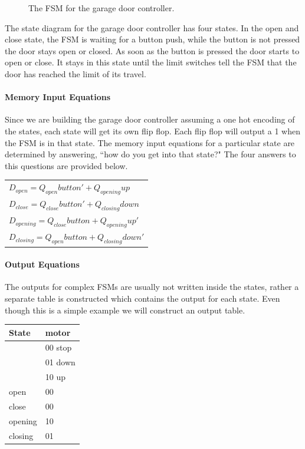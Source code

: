 \begin{enumerate}
\begin{onlysolution}
{\begin{figure}[ht]
\caption{The FSM for the garage door controller.}
\end{figure}

The state diagram for the garage door controller has four states.
In the open and close state, the FSM is waiting for a button push,
while the button is not pressed the door stays open or closed.  As
soon as the button is pressed the door starts to open or close.
It stays in this state until the limit switches tell the FSM that
the door has reached the limit of its travel.

\paragraph{Memory Input Equations}
Since we are building the garage door controller assuming a
one hot encoding of the states, each state will get its own
flip flop.  Each flip flop will output a 1 when the FSM is 
in that state.  The memory input equations for a particular
state are determined by answering, ``how do you get into that 
state?" The four answers to this questions are provided below.

\begin{tabular}{l}
$D_{open} = Q_{open}button' + Q_{opening}up$ \\
$D_{close} = Q_{close}button' + Q_{closing}down$ \\
$D_{opening} = Q_{close}button+ Q_{opening}up'$ \\
$D_{closing}  = Q_{open}button+ Q_{closing}down'$ \\
\end{tabular}


\paragraph{Output Equations}
The outputs for complex FSMs are usually not written inside the
states, rather a separate table is constructed which contains the
output for each state.   Even though this is a simple example
we will construct an output table.

\begin{tabular}{l|l}
State	& motor		\\ \hline
	& 00 stop	\\ \hline
	& 01 down	\\ \hline
	& 10 up		\\ \hline
open    & 00 		\\ \hline
close   & 00		\\ \hline
opening & 10 		\\ \hline
closing & 01 		\\ 
\end{tabular}

}
\end{onlysolution}
\end{enumerate}
